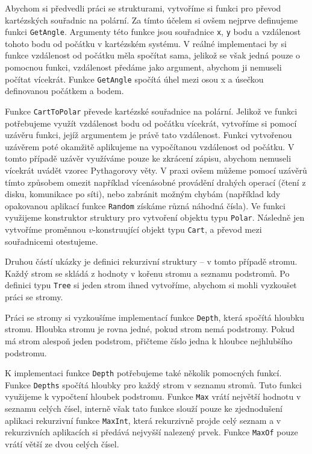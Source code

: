 Abychom si předvedli práci se strukturami, vytvoříme si funkci pro převod kartézských souřadnic
na polární. Za tímto účelem si ovšem nejprve definujeme funkci \lstinline{GetAngle}. Argumenty
této funkce jsou souřadnice \lstinline{x}, \lstinline{y} bodu a vzdálenost tohoto bodu od počátku
v kartézském systému. V reálné implementaci by si funkce vzdálenost od počátku měla spočítat sama,
jelikož se však jedná pouze o pomocnou funkci, vzdálenost předáme jako argument, abychom ji nemuseli
počítat vícekrát. Funkce \lstinline{GetAngle} spočítá úhel mezi osou x a úsečkou definovanou
počátkem a bodem.

Funkce \lstinline{CartToPolar} převede kartézské souřadnice na polární. Jelikož ve funkci
potřebujeme využít vzdálenost bodu od počátku vícekrát, vytvoříme si pomocí uzávěru funkci, jejíž
argumentem je právě tato vzdálenost. Funkci vytvořenou uzávěrem poté okamžitě aplikujeme
na vypočítanou vzdálenost od počátku. V tomto případě uzávěr využíváme pouze ke zkrácení zápisu,
abychom nemuseli vícekrát uvádět vzorec Pythagorovy věty. V praxi ovšem můžeme pomocí uzávěrů
tímto způsobem omezit například vícenásobné provádění drahých operací (čtení z disku, komunikace
po síti), nebo zabránit možným chybám (například kdy opakovanou aplikací funkce \lstinline{Random}
získáme různá náhodná čísla). Ve funkci využijeme konstruktor struktury pro vytvoření objektu typu
\lstinline{Polar}. Následně jen vytvoříme proměnnou $v$-konstruující objekt typu \lstinline{Cart},
a převod mezi souřadnicemi otestujeme.

Druhou částí ukázky je definici rekurzivní struktury -- v tomto případě stromu. Každý strom se skládá
z hodnoty v kořenu stromu a seznamu podstromů. Po definici typu \lstinline{Tree} si jeden strom
ihned vytvoříme, abychom si mohli vyzkoušet práci se stromy.

Práci se stromy si vyzkoušíme implementací funkce \lstinline{Depth}, která spočítá hloubku stromu.
Hloubka stromu je rovna jedné, pokud strom nemá podstromy. Pokud má strom alespoň jeden podstrom,
přičteme číslo jedna k hloubce nejhlubšího podstromu.

K implementaci funkce \lstinline{Depth} potřebujeme také několik pomocných funkcí. Funkce
\lstinline{Depths} spočítá hloubky pro každý strom v seznamu stromů. Tuto funkci využijeme
k vypočtení hloubek podstromu. Funkce \lstinline{Max} vrátí největší hodnotu v seznamu celých
čísel, interně však tato funkce slouží pouze ke zjednodušení aplikaci rekurzivní funkce
\lstinline{MaxInt}, která rekurzivně projde celý seznam a v rekurzivních aplikacích si předává
nejvyšší nalezený prvek. Funkce \lstinline{MaxOf} pouze vrátí větší ze dvou celých čísel.

